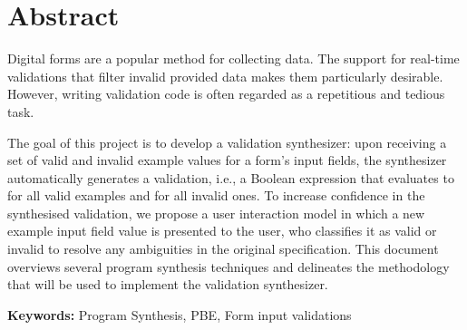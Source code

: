 \section*{Abstract}

Digital forms are a popular method for collecting data.
The support for real-time validations that filter invalid provided data makes them particularly desirable.
However, writing validation code is often regarded as a repetitious and tedious task.

The goal of this project is to develop a validation synthesizer: upon receiving a set of valid and invalid example values for a form’s input fields, the synthesizer automatically generates a validation, i.e., a Boolean expression that evaluates to \true{} for all valid examples and \false{} for all invalid ones. 
To increase confidence in the synthesised validation, we propose a user interaction model in which a new example input field value is presented to the user, who classifies it as valid or invalid to resolve any ambiguities in the original specification.
This document overviews several program synthesis techniques and delineates the methodology that will be used to implement the validation synthesizer.

\vfill

\textbf{\Large Keywords:} Program Synthesis, \acl{PBE}, Form input validations

\cleardoublepage
